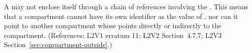 A \Compartment may not enclose itself through a chain of references
involving the  .  This means that a compartment cannot
have its own identifier as the value of , nor can it point
to another compartment whose   points directly or
indirectly to the compartment.  (References: L2V1 erratum 11; L2V2 Section~4.7.7;
L2V3 Section~\ref{sec:compartment-outside}.)
